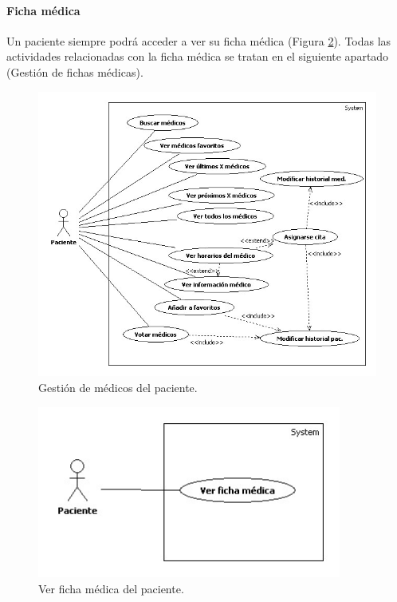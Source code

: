 \documentclass[a4paper,oneside,11pt]{book}
\begin{document}
			
			\paragraph{Ficha médica} %
			\label{par:ficha_medica}
				
				Un paciente siempre podrá acceder a ver su ficha médica (Figura \ref{fig:ficha_pac}). Todas las actividades relacionadas con la ficha médica se tratan en el siguiente apartado (Gestión de fichas médicas).
				\begin{figure}[H]
				  \centering
				    \includegraphics[width=14cm]{img/jpg/casos_uso/Gestion_medicos.jpg}
				  \caption{Gestión de médicos del paciente.}
				  \label{fig:med_pac}
				\end{figure}
				
				\begin{figure}[H]
				  \centering
				    \includegraphics[width=10cm]{img/jpg/casos_uso/Ver_ficha_medica.jpg}
				  \caption{Ver ficha médica del paciente.}
				  \label{fig:ficha_pac}
				\end{figure}
			
\end{document}
